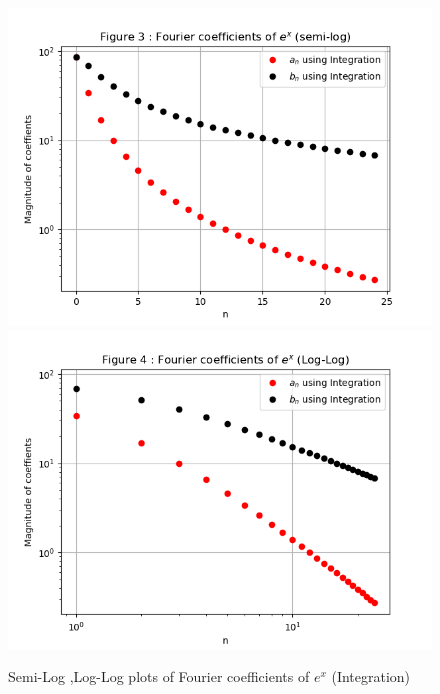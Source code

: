 \documentclass[11pt, a4paper]{article}
\begin{document}
  \begin{figure}[!tbh]
     \centering
     \includegraphics[scale=0.75]{./../Extras/5.png}  
     \includegraphics[scale=0.75]{./../Extras/6.png}
     \caption{Semi-Log ,Log-Log plots of Fourier coefficients of $e^x$ (Integration)}  
\end{figure}
\end{document}
